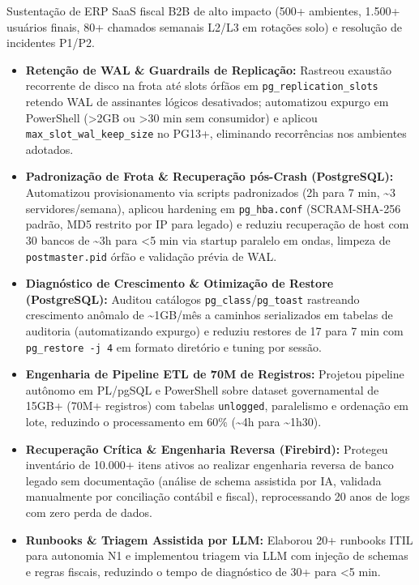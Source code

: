 \documentclass[10pt,a4paper]{article}
\begin{document}
Sustentação de ERP SaaS fiscal B2B de alto impacto (500+ ambientes, 1.500+ usuários finais, 80+ chamados semanais \mbox{L2/L3} em rotações solo) e resolução de incidentes \mbox{P1/P2}.
\begin{itemize}[topsep=1.5pt]
    \item \textbf{Retenção de WAL \& Guardrails de Replicação:} Rastreou exaustão recorrente de disco na frota até slots órfãos em \mbox{\texttt{pg\_replication\_slots}} retendo WAL de assinantes lógicos desativados; automatizou expurgo em PowerShell (>2GB ou >30 min sem consumidor) e aplicou \mbox{\texttt{max\_slot\_wal\_keep\_size}} no PG13+, eliminando recorrências nos ambientes adotados.
    \item \textbf{Padronização de Frota \& Recuperação \mbox{pós-Crash} (PostgreSQL):} Automatizou provisionamento via scripts padronizados (2h para 7 min, \textasciitilde{}3 servidores/semana), aplicou hardening em \mbox{\texttt{pg\_hba.conf}} (\mbox{SCRAM-SHA-256} padrão, MD5 restrito por IP para legado) e reduziu recuperação de host com 30 bancos de \textasciitilde{}3h para <5 min via startup paralelo em ondas, limpeza de \mbox{\texttt{postmaster.pid}} órfão e validação prévia de WAL.
    \item \textbf{Diagnóstico de Crescimento \& Otimização de Restore (PostgreSQL):} Auditou catálogos \texttt{pg\_class}/\texttt{pg\_toast} rastreando crescimento anômalo de \textasciitilde{}1GB/mês a caminhos serializados em tabelas de auditoria (automatizando expurgo) e reduziu restores de 17 para 7 min com \mbox{\texttt{pg\_restore -j~4}} em formato diretório e tuning por sessão.
    \item \textbf{Engenharia de Pipeline ETL de 70M de Registros:} Projetou pipeline autônomo em PL/pgSQL e PowerShell sobre dataset governamental de 15GB+ (70M+ registros) com tabelas \texttt{unlogged}, paralelismo e ordenação em lote, reduzindo o processamento em 60\% (\textasciitilde{}4h para \textasciitilde{}1h30).
    \item \textbf{Recuperação Crítica \& Engenharia Reversa (Firebird):} Protegeu inventário de 10.000+ itens ativos ao realizar engenharia reversa de banco legado sem documentação (análise de schema assistida por IA, validada manualmente por conciliação contábil e fiscal), reprocessando 20 anos de logs com zero perda de dados.
    \item \textbf{Runbooks \& Triagem Assistida por LLM:} Elaborou 20+ runbooks ITIL para autonomia N1 e implementou triagem via LLM com injeção de schemas e regras fiscais, reduzindo o tempo de diagnóstico de 30+ para <5 min.
\end{itemize}
\end{document}
